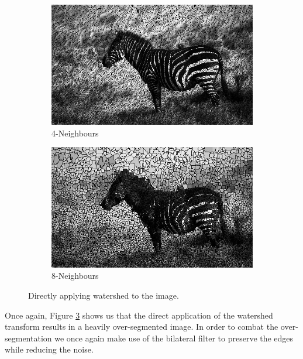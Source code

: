 \documentclass{article}
\begin{document}
\begin{figure}[H]
\centering
\begin{subfigure}{10cm}
  \centering
  \includegraphics[scale=0.3]{experiments/zebra/4_zebra_segmented.jpg}
  \caption{4-Neighbours}
  \label{fig:zebra_3}
\end{subfigure}    
\begin{subfigure}{10cm}
  \centering
  \includegraphics[scale=0.3]{experiments/zebra/8_zebra_segmented.jpg}
  \caption{8-Neighbours}
  \label{fig:zebra_4}
\end{subfigure}
\label{fig:zebra1}
\caption{Directly applying watershed to the image.}
\end{figure}
\begin{flushleft}
Once again, Figure \ref{fig:zebra1} shows us that the direct application of the watershed transform results in a heavily over-segmented image. In order to combat the over-segmentation we once again make use of the bilateral filter to preserve the edges while reducing the noise.
\end{flushleft}
\end{document}
